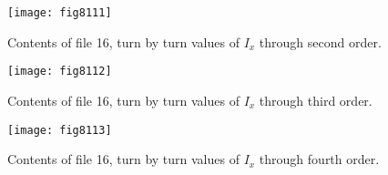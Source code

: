\begin{figure}[htp]
  \centering
  \texttt{[image: fig8111]}
  \caption{Contents of file 16, turn by turn values of $I_x$ through second order.}
\end{figure}

\newpage
\begin{figure}[htp]
  \centering
  \texttt{[image: fig8112]}
  \caption{Contents of file 16, turn by turn values of $I_x$ through third order.}
\end{figure}

\begin{figure}[htp]
  \centering
  \texttt{[image: fig8113]}
  \caption{Contents of file 16, turn by turn values of $I_x$ through fourth order.}
\end{figure}

\newpage
